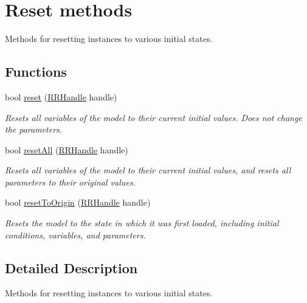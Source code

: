\hypertarget{group__reset}{\section{Reset methods}
\label{group__reset}
}


Methods for resetting instances to various initial states.  


\subsection*{Functions}
\begin{DoxyCompactItemize}
\item 
bool \hyperlink{group__reset_gaeaf9374c9a0cad0898f5e0a37bc387c5}{reset} (\hyperlink{rrc__types_8h_a1d68f0592372208fa5a5f2799ea4b3ae}{R\+R\+Handle} handle)
\begin{DoxyCompactList}\small\item\em Resets all variables of the model to their current initial values. Does not change the parameters. \end{DoxyCompactList}\item 
bool \hyperlink{group__reset_ga0fdde5a5cdd90408a0e2050d8e4243ec}{reset\+All} (\hyperlink{rrc__types_8h_a1d68f0592372208fa5a5f2799ea4b3ae}{R\+R\+Handle} handle)
\begin{DoxyCompactList}\small\item\em Resets all variables of the model to their current initial values, and resets all parameters to their original values. \end{DoxyCompactList}\item 
bool \hyperlink{group__reset_ga30ad9eec8febc573febf1ad8b40c99ad}{reset\+To\+Origin} (\hyperlink{rrc__types_8h_a1d68f0592372208fa5a5f2799ea4b3ae}{R\+R\+Handle} handle)
\begin{DoxyCompactList}\small\item\em Resets the model to the state in which it was first loaded, including initial conditions, variables, and parameters. \end{DoxyCompactList}\end{DoxyCompactItemize}


\subsection{Detailed Description}
Methods for resetting instances to various initial states. 



